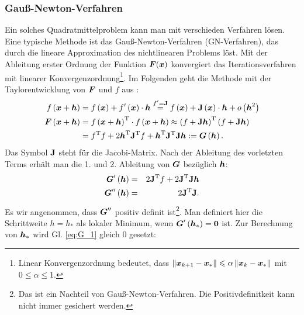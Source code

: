 \subsubsection{Gauß-Newton-Verfahren}\label{Gauß-Newton-Verfahren}
Ein solches Quadratmittelproblem kann man mit verschieden Verfahren lösen. Eine typische Methode ist das Gauß-Newton-Verfahren (GN-Verfahren), das durch die lineare Approximation des nichtlinearen Problems löst. Mit der Ableitung erster Ordnung der Funktion $\boldsymbol F(\boldsymbol x)$ konvergiert das Iterationsverfahren mit linearer Konvergenzordnung\footnote{Linear Konvergenzordnung bedeutet, dass $\left\|\boldsymbol x_{k+1} -\boldsymbol x_{\ast}\right\| \leqslant \alpha \left\|\boldsymbol x_{k}-\boldsymbol x_{\ast}\right\|$ mit $0 \leqslant \alpha \leqslant 1$.}. Im Folgenden geht die Methode mit der Taylorentwicklung von $\boldsymbol F$ und $f$ aus \cite{madsen2004methods}:
\begin{equation}
\begin{aligned}
f\left ( \boldsymbol x+\boldsymbol h \right ) &= f\left ( \boldsymbol x \right ) + f'\left ( \boldsymbol x \right )\cdot \boldsymbol h \overset{f' = \mathbf{J}}{=} f\left ( \boldsymbol x \right ) + \mathbf{J}\left ( \boldsymbol x \right )\cdot \boldsymbol h + o\left ( \boldsymbol h^{2} \right )\\
\boldsymbol F\left ( \boldsymbol x+\boldsymbol h \right ) &= f\left ( \boldsymbol x+\boldsymbol h \right )^ \mathrm{ T }\cdot f\left ( \boldsymbol x+\boldsymbol h \right )\approx \left ( f+\mathbf{J}\boldsymbol h \right )^ \mathrm{ T }\left ( f+\mathbf{J}\boldsymbol h \right )\\ &= f^ \mathrm{ T }f+2\boldsymbol h^ \mathrm{ T }\mathbf{J}^ \mathrm{ T }f + \boldsymbol h^ \mathrm{ T }\mathbf{J}^ \mathrm{ T }\mathbf{J}\boldsymbol h := \boldsymbol G\left ( \boldsymbol h \right ).\label{eq:Taylorentwicklung_von_GN_Verfahren}
\end{aligned}
\end{equation}
Das Symbol $\mathbf{J}$ steht für die Jacobi-Matrix. Nach der Ableitung des vorletzten Terms erhält man die 1. und 2. Ableitung von $\boldsymbol G$ bezüglich $\boldsymbol h$:
\begin{eqnarray}
\boldsymbol G'\left ( \boldsymbol h \right )  &=& 2\mathbf{J}^\mathrm{T}f + 2\mathbf{J}^\mathrm{T}\mathbf{J}\boldsymbol h\label{eq:G_1}\\
\boldsymbol G''\left ( \boldsymbol h \right ) &=& 2\mathbf{J}^\mathrm{T}\mathbf{J}.\label{eq:G_2}
\end{eqnarray}
Es wir angenommen, dass $\boldsymbol G''$ positiv definit ist\footnote{Das ist ein Nachteil von Gauß-Newton-Verfahren. Die Positivdefinitkeit kann nicht immer gesichert werden.}. Man definiert hier die Schrittweite $h=h_{\ast}$ als lokaler Minimum, wenn $\boldsymbol G'\left (\boldsymbol h_{\ast} \right ) = \boldsymbol 0$ ist. Zur Berechnung von $\boldsymbol h_{\ast}$ wird Gl. \eqref{eq:G_1} gleich $0$ gesetzt:
